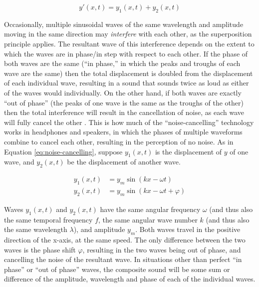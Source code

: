 \begin{equation}
	y'(x, t) = y_1(x, t) + y_2(x, t)
\end{equation}

Occasionally, multiple sinusoidal waves of the same wavelength and amplitude moving in the same direction may \textit{interfere} with each other, as the superposition principle applies. The resultant wave of this interference depends on the extent to which the waves are in phase/in step with respect to each other. If the phase of both waves are the same (``in phase,'' in which the peaks and troughs of each wave are the same) then the total displacement is doubled from the displacement of each individual wave, resulting in a sound that sounds twice as loud as either of the waves would individually. On the other hand, if both waves are exactly ``out of phase'' (the peaks of one wave is the same as the troughs of the other) then the total interference will result in the cancellation of noise, as each wave will fully cancel the other \cite{Halliday_Resnick_Walker_2005}. This is how much of the ``noise-cancelling'' technology works in headphones and speakers, in which the phases of multiple waveforms combine to cancel each other, resulting in the perception of no noise. As in Equation \ref{eq:noise-cancelling}, suppose $y_1(x, t)$ is the displacement of $y$ of one wave, and $y_2(x, t)$ be the displacement of another wave. 

\begin{equation}
	\begin{aligned}
	y_1(x, t) &= y_m\sin(kx - \omega t) \\ 
	y_2(x, t) &= y_m\sin(kx - \omega t + \varphi)
	\label{eq:noise-cancelling}
	\end{aligned}
\end{equation}

Waves $y_1(x, t)$ and $y_2(x, t)$ have the same angular frequency $\omega$ (and thus also the same temporal frequency $f$, the same angular wave number $k$ (and thus also the same wavelength $\lambda$), and amplitude $y_m$. Both waves travel in the positive direction of the x-axis, at the same speed. The only difference between the two waves is the phase shift $\varphi$, resulting in the two waves being out of phase, and cancelling the noise of the resultant wave. In situations other than perfect ``in phase'' or ``out of phase'' waves, the composite sound will be some sum or difference of the amplitude, wavelength and phase of each of the individual waves.

